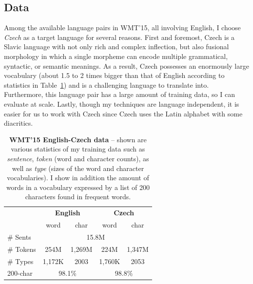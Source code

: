 \subsection{Data}
Among the available language pairs in WMT'15, all involving English, 
I choose {\it Czech} as a target language for several reasons. First and
foremost, Czech is a Slavic language with not only rich
and complex inflection,
but also fusional morphology in which a single morpheme can encode multiple
grammatical, syntactic, or semantic meanings. As a result, Czech possesses an enormously large
vocabulary (about 1.5 to 2 times bigger than that of English according to 
statistics in Table~\ref{t:data}) and is a challenging language to translate
into. Furthermore, this language pair has a large
amount of training data, so %
I can evaluate at scale. Lastly, though my techniques are language
independent, it is easier for us to work with Czech since Czech uses the Latin alphabet with some
diacritics. %

\begin{table} %
\centering
\begin{tabular}{l|c|c|c|c}
& \multicolumn{2}{c|}{\bf{English}} & \multicolumn{2}{c}{\bf{Czech}}\\
  \cline{2-5}
& word & char & word & char \\
  \hline
  \# Sents & \multicolumn{4}{c}{15.8M} \\
  \hdashline
  \# Tokens & 254M & 1,269M & 224M & 1,347M \\ 
 \hdashline
  \# Types & 1,172K & 2003 & 1,760K & 2053\\ 
  \hline
  200-char & \multicolumn{2}{c|}{98.1\%} & \multicolumn{2}{c}{98.8\%} \\
\end{tabular}
\caption[WMT'15 English-Czech data]{{\bf WMT'15 English-Czech data} -- shown are various statistics of my training
data such as {\it sentence}, {\it token} (word and character counts), as well as
{\it type} (sizes of the word and character vocabularies).
I show in addition the amount of words in a vocabulary expressed by a list of 200 characters found
in frequent words.}
\label{t:data}
\end{table}

